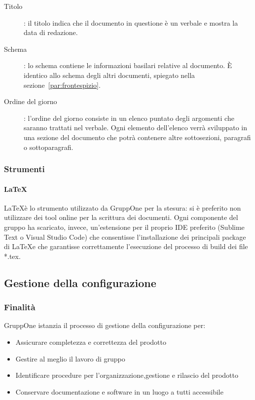 \documentclass[../norme-di-progetto.tex]{subfiles}
\begin{document}
\begin{description}
  \item [Titolo]: il titolo indica che il documento in questione è un verbale e mostra la data di redazione.
  \item [Schema]: lo schema contiene le informazioni basilari relative al documento. È identico allo schema degli altri documenti, spiegato nella sezione~\ref{par:frontespizio}.
  \item [Ordine del giorno]: l'ordine del giorno consiste in un elenco puntato degli argomenti che saranno trattati nel verbale. Ogni elemento dell'elenco verrà sviluppato in una sezione del documento che potrà contenere altre sottosezioni, paragrafi o sottoparagrafi.
\end{description}

\subsubsection{Strumenti}

\paragraph {\LaTeX}%
\label{par:LaTeX}
\LaTeX è lo strumento utilizzato da GruppOne per la stesura: si è preferito non utilizzare dei tool online per la scrittura dei documenti.
Ogni componente del gruppo ha scaricato, invece, un'estensione per il proprio IDE preferito (Sublime Text o Visual Studio Code) che consentisse l'installazione dei principali package di \LaTeX e che garantisse correttamente l'esecuzione del processo di build dei file *.tex.

\subsection{Gestione della configurazione}%
\label{sub:gestione_della_configurazione}

\subsubsection{Finalità}%
\label{subs:gestione_della_configurazione/finalita}

GruppOne istanzia il processo di gestione della configurazione per:
\begin{itemize}
  \item Assicurare completezza e correttezza del prodotto
  \item Gestire al meglio il lavoro di gruppo
  \item Identificare procedure per l'organizzazione,gestione e rilascio del prodotto
  \item Conservare documentazione e software in un luogo a tutti accessibile
\end{itemize}
\end{document}
